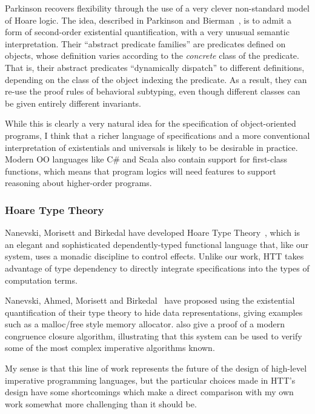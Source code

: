 Parkinson recovers flexibility through the use of a very clever
non-standard model of Hoare logic. The idea, described in Parkinson
and Bierman~\cite{parkinson-bierman-05}, is to admit a form of
second-order existential quantification, with a very unusual semantic
interpretation. Their ``abstract predicate families'' are predicates
defined on objects, whose definition varies according to the
\emph{concrete} class of the predicate. That is, their abstract
predicates ``dynamically dispatch'' to different definitions,
depending on the class of the object indexing the predicate. As a
result, they can re-use the proof rules of behavioral subtyping, even
though different classes can be given entirely different invariants.

While this is clearly a very natural idea for the specification of
object-oriented programs, I think that a richer language of
specifications and a more conventional interpretation of existentials
and universals is likely to be desirable in practice. Modern OO
languages like C\# and Scala also contain support for first-class
functions, which means that program logics will need features to
support reasoning about higher-order programs.

\subsubsection{Hoare Type Theory}

Nanevski, Morisett and Birkedal have developed Hoare Type
Theory~\cite{htt, nanevski08}, which is an elegant and sophisticated
dependently-typed functional language that, like our system, uses a
monadic discipline to control effects.  Unlike our work, HTT takes
advantage of type dependency to directly integrate specifications into
the types of computation terms.

Nanevski, Ahmed, Morisett and Birkedal~\cite{abstract-htt} have
proposed using the existential quantification of their type theory to
hide data representations, giving examples such as a malloc/free style
memory allocator. \citet{nanevski-victor-10} also give
a proof of a modern congruence closure algorithm, illustrating that
this system can be used to verify some of the most complex imperative
algorithms known.

My sense is that this line of work represents the future of the design
of high-level imperative programming languages, but the particular
choices made in HTT's design have some shortcomings which make a
direct comparison with my own work somewhat more challenging than it
should be.

